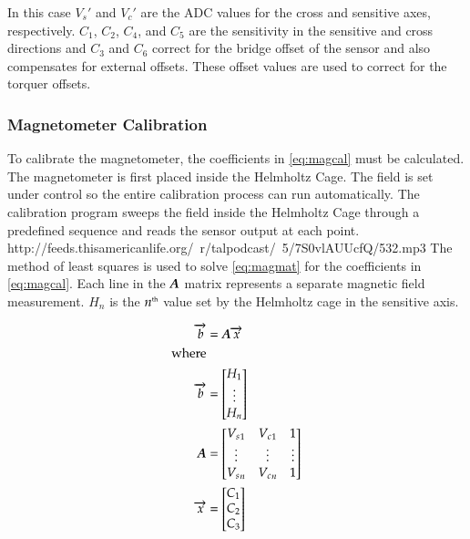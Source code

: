 In this case $V_s'$ and $V_c'$ are the \ac{ADC} values for the cross and sensitive axes, respectively. $C_1$, $C_2$, $C_4$, and $C_5$ are the sensitivity in the sensitive and cross directions and $C_3$ and $C_6$ correct for the bridge offset of the sensor and also compensates for external offsets. These offset values are used to correct for the torquer offsets.

\subsubsection{Magnetometer Calibration}
\label{sec:magcal}

To calibrate the magnetometer, the coefficients in \cref{eq:magcal} must be calculated. The magnetometer is first placed inside the Helmholtz Cage. The field is set under \matlab control so the entire calibration process can run automatically. The calibration program sweeps the field inside the Helmholtz Cage through a predefined sequence and reads the sensor output at each point. 
http://feeds.thisamericanlife.org/~r/talpodcast/~5/7S0vlAUUcfQ/532.mp3
The method of least squares is used to solve \cref{eq:magmat} for the coefficients in \cref{eq:magcal}. Each line in the $\boldsymbol{A}$ matrix represents a separate magnetic field measurement. $H_n$ is the $n^{\text{\tiny th}}$ value set by the Helmholtz cage in the sensitive axis. 

\begin{equation}
    \label{eq:magmat}
    \begin{split}
    \vect{b}&=\matt{A} \vect{x} \\
    {\text{\raggedright where}} \\
    \vect{b}&= 
    \begin{bmatrix}
        H_1 \\
        \vdots \\
        H_n \\
    \end{bmatrix} \\
    \matt{A}&=
    \begin{bmatrix}
        {V_s}_1 & {V_c}_1 & 1 \\
        \vdots & \vdots & \vdots\\
        {V_s}_n & {V_c}_n & 1 \\
    \end{bmatrix} \\
    \vect{x}&= 
    \begin{bmatrix}
        C_1 \\
        C_2 \\
        C_3 \\
    \end{bmatrix} 
    \end{split}
\end{equation}

